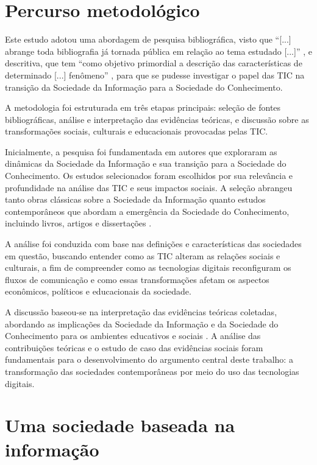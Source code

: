 \documentclass[portuguese]{textolivre}
\begin{document}
\section{Percurso metodológico}

Este estudo adotou uma abordagem de pesquisa bibliográfica, visto que
``{[}...{]} abrange toda bibliografia já tornada pública em relação ao
tema estudado {[}...{]}'' \cite[p.~183]{marconi2019}, e descritiva, que
tem ``como objetivo primordial a descrição das características de
determinado {[}...{]} fenômeno'' \cite[46]{gil2020}, para que se
pudesse investigar o papel das TIC na transição da Sociedade da
Informação para a Sociedade do Conhecimento.

A metodologia foi estruturada em três etapas principais: seleção de
fontes bibliográficas, análise e interpretação das evidências teóricas,
e discussão sobre as transformações sociais, culturais e educacionais
provocadas pelas TIC.

Inicialmente, a pesquisa foi fundamentada em autores que exploraram as
dinâmicas da Sociedade da Informação e sua transição para a Sociedade do
Conhecimento. Os estudos selecionados foram escolhidos por sua
relevância e profundidade na análise das TIC e seus impactos sociais. A
seleção abrangeu tanto obras clássicas sobre a Sociedade da Informação
quanto estudos contemporâneos que abordam a emergência da Sociedade do
Conhecimento, incluindo livros, artigos e dissertações \cite{gil2020}.

A análise foi conduzida com base nas definições e características das
sociedades em questão, buscando entender como as TIC alteram as relações
sociais e culturais, a fim de compreender como as tecnologias digitais
reconfiguram os fluxos de comunicação e como essas transformações afetam
os aspectos econômicos, políticos e educacionais da sociedade.

A discussão baseou-se na interpretação das evidências teóricas
coletadas, abordando as implicações da Sociedade da Informação e da
Sociedade do Conhecimento para os ambientes educativos e sociais
\cite{marconi2019}. A análise das contribuições teóricas e o estudo de
caso das evidências sociais foram fundamentais para o desenvolvimento do
argumento central deste trabalho: a transformação das sociedades
contemporâneas por meio do uso das tecnologias digitais.


\section{Uma sociedade baseada na informação}
\end{document}
